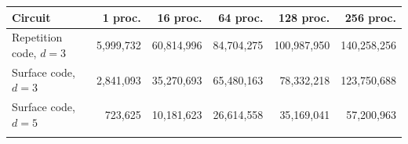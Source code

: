 \begin{tabular}{@{}lrrrrr@{}}
\toprule
Circuit & 1 proc. & 16 proc. & 64 proc. & 128 proc. & 256 proc. \\
\midrule
Repetition code, $d=3$ & 5{,}999{,}732 & 60{,}814{,}996 & 84{,}704{,}275 & 100{,}987{,}950 & 140{,}258{,}256 \\
Surface code, $d=3$ & 2{,}841{,}093 & 35{,}270{,}693 & 65{,}480{,}163 & 78{,}332{,}218 & 123{,}750{,}688 \\
Surface code, $d=5$ & 723{,}625 & 10{,}181{,}623 & 26{,}614{,}558 & 35{,}169{,}041 & 57{,}200{,}963 \\
\botrule
\end{tabular}
